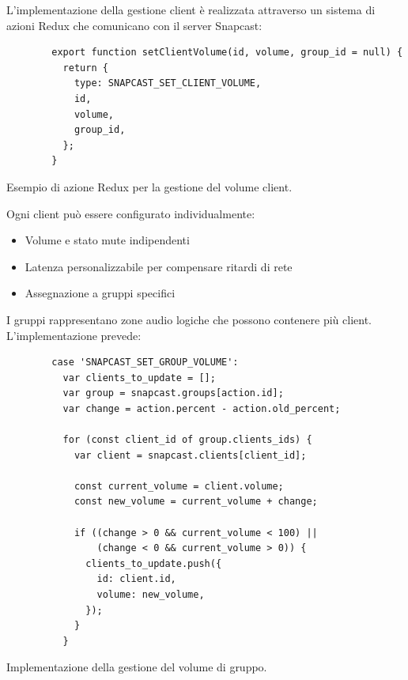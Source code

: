 L'implementazione della gestione client è realizzata attraverso un sistema di azioni Redux che comunicano con il server Snapcast:

\begin{table}[H]
  \begin{algorithm}[H]
    \caption{}
    \BlankLine
      \begin{verbatim}
        export function setClientVolume(id, volume, group_id = null) {
          return {
            type: SNAPCAST_SET_CLIENT_VOLUME,
            id,
            volume,
            group_id,
          };
        }
      \end{verbatim}
    \end{algorithm}
    \caption{Esempio di azione Redux per la gestione del volume client.}
    \label{tab:redux_azione}
\end{table}

Ogni client può essere configurato individualmente:

\begin{itemize}
    \item Volume e stato mute indipendenti
    \item Latenza personalizzabile per compensare ritardi di rete
    \item Assegnazione a gruppi specifici
\end{itemize}

I gruppi rappresentano zone audio logiche che possono contenere più client. L'implementazione prevede:

\begin{table}[h]
  \begin{algorithm}[H]
    \caption{}
    \BlankLine
      \begin{verbatim}
        case 'SNAPCAST_SET_GROUP_VOLUME':
          var clients_to_update = [];
          var group = snapcast.groups[action.id];
          var change = action.percent - action.old_percent;
  
          for (const client_id of group.clients_ids) {
            var client = snapcast.clients[client_id];
  
            const current_volume = client.volume;
            const new_volume = current_volume + change;
  
            if ((change > 0 && current_volume < 100) || 
                (change < 0 && current_volume > 0)) {
              clients_to_update.push({
                id: client.id,
                volume: new_volume,
              });
            }
          }
      \end{verbatim}
    \end{algorithm}
    \caption{Implementazione della gestione del volume di gruppo.}
    \label{tab:volume_gruppo}
\end{table}

